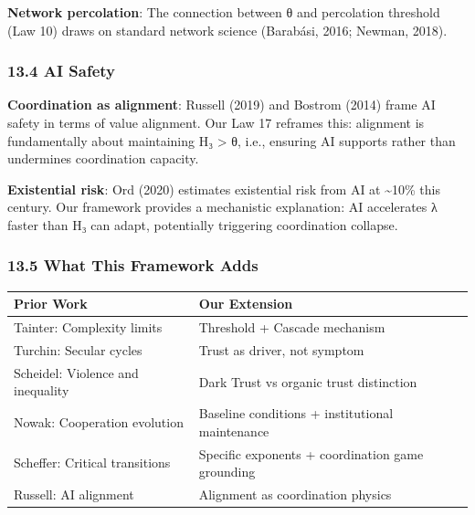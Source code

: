 \documentclass[11pt,letterpaper]{article}
\begin{document}
\textbf{Network percolation}: The connection between θ and percolation
threshold (Law 10) draws on standard network science (Barabási, 2016;
Newman, 2018).

\subsubsection{13.4 AI Safety}\label{ai-safety}

\textbf{Coordination as alignment}: Russell (2019) and Bostrom (2014)
frame AI safety in terms of value alignment. Our Law 17 reframes this:
alignment is fundamentally about maintaining H₃ \textgreater{} θ, i.e.,
ensuring AI supports rather than undermines coordination capacity.

\textbf{Existential risk}: Ord (2020) estimates existential risk from AI
at \textasciitilde10\% this century. Our framework provides a
mechanistic explanation: AI accelerates λ faster than H₃ can adapt,
potentially triggering coordination collapse.

\subsubsection{13.5 What This Framework
Adds}\label{what-this-framework-adds}

\begin{longtable}[]{@{}
  >{\raggedright\arraybackslash}p{}
  >{\raggedright\arraybackslash}p{}@{}}
\toprule\noalign{}
\begin{minipage}[b]{\linewidth}\raggedright
Prior Work
\end{minipage} & \begin{minipage}[b]{\linewidth}\raggedright
Our Extension
\end{minipage} \\
\midrule\noalign{}
\endhead
\bottomrule\noalign{}
\endlastfoot
Tainter: Complexity limits & Threshold + Cascade mechanism \\
Turchin: Secular cycles & Trust as driver, not symptom \\
Scheidel: Violence and inequality & Dark Trust vs organic trust
distinction \\
Nowak: Cooperation evolution & Baseline conditions + institutional
maintenance \\
Scheffer: Critical transitions & Specific exponents + coordination game
grounding \\
Russell: AI alignment & Alignment as coordination physics \\
\end{longtable}
\end{document}
